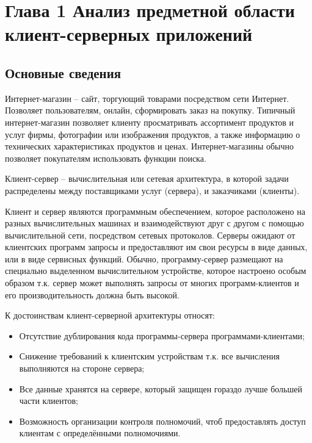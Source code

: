 \section[Глава 1 Анализ предметной области клиент-серверных приложений]{Глава 1 \break Анализ предметной области клиент-серверных приложений}
\label{sec:charpter-1-analisis}

\subsection{Основные сведения}\label{subsec:1-common-info}\indent

Интернет-магазин – сайт, торгующий товарами посредством сети Интернет.
Позволяет пользователям, онлайн, сформировать заказ на покупку.
Типичный интернет-магазин позволяет клиенту просматривать ассортимент продуктов и услуг фирмы, фотографии или изображения продуктов, а также информацию о технических характеристиках продуктов и ценах.
Интернет-магазины обычно позволяет покупателям использовать функции поиска.

Клиент-сервер – вычислительная или сетевая архитектура, в которой задачи распределены между поставщиками услуг (сервера), и заказчиками (клиенты).

Клиент и сервер являются программным обеспечением, которое расположено на разных вычислительных машинах и взаимодействуют друг с другом с помощью вычислительной сети, посредством сетевых протоколов.
Серверы ожидают от клиентских программ запросы и предоставляют им свои ресурсы в виде данных, или в виде сервисных функций.
Обычно, программу-сервер размещают на специально выделенном вычислительном устройстве, которое настроено особым образом т.к. сервер может выполнять запросы от многих программ-клиентов и его производительность должна быть высокой.\cite{client-server}

К достоинствам клиент-серверной архитектуры относят:

\begin{itemize}
    \item Отсутствие дублирования кода программы-сервера программами-клиентами;
    \item Снижение требований к клиентским устройствам т.к. все вычисления выполняются на стороне сервера;
    \item Все данные хранятся на сервере, который защищен гораздо лучше большей части клиентов;
    \item Возможность организации контроля полномочий, чтоб предоставлять доступ клиентам с определёнными полномочиями.
\end{itemize}

